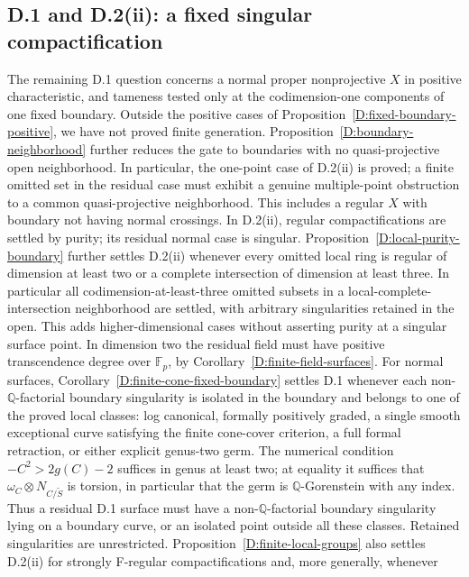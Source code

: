 \subsection{D.1 and D.2(ii): a fixed singular compactification}
\begin{remark}\label{D:fixed-boundary-gate}
The remaining D.1 question concerns a normal proper nonprojective
$X$ in positive characteristic, and tameness tested only at the
codimension-one components of one fixed boundary. Outside the positive
cases of Proposition~\ref{D:fixed-boundary-positive}, we have not
proved finite generation. Proposition~\ref{D:boundary-neighborhood}
further reduces the gate to boundaries with no quasi-projective open
neighborhood. In particular, the one-point case of D.2(ii) is proved;
a finite omitted set in the residual case must exhibit a genuine
multiple-point obstruction to a common quasi-projective neighborhood.
This includes a regular $X$ with boundary
not having normal crossings. In D.2(ii), regular compactifications
are settled by purity; its residual normal case is singular.
Proposition~\ref{D:local-purity-boundary} further settles D.2(ii)
whenever every omitted local ring is regular of dimension at least
two or a complete intersection of dimension at least three.
In particular all codimension-at-least-three omitted subsets in a
local-complete-intersection neighborhood are settled, with arbitrary
singularities retained in the open.  This adds higher-dimensional
cases without asserting purity at a singular surface point.
In dimension two the residual field must have positive
transcendence degree over $\mathbb F_p$, by
Corollary~\ref{D:finite-field-surfaces}.
For normal surfaces, Corollary~\ref{D:finite-cone-fixed-boundary}
settles D.1 whenever each non-$\mathbb Q$-factorial boundary
singularity is isolated in the boundary and belongs to one of
the proved local classes: log canonical, formally positively
graded, a single smooth exceptional curve satisfying the finite
cone-cover criterion, a full formal retraction, or either explicit
genus-two germ.  The numerical condition $-C^2>2g(C)-2$ suffices
in genus at least two; at equality it suffices that
$\omega_C\otimes N_{C/\widetilde S}$ is torsion, in particular
that the germ is $\mathbb Q$-Gorenstein with any index.
Thus a residual D.1 surface must have a non-$\mathbb Q$-factorial
boundary singularity lying on a boundary curve, or an isolated
point outside all these classes.  Retained singularities are
unrestricted.
Proposition~\ref{D:finite-local-groups} also settles D.2(ii) for
strongly F-regular compactifications and, more generally, whenever

\end{remark}
